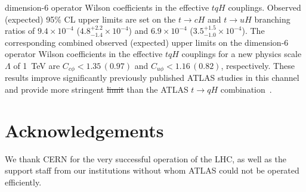 \documentclass[PAPER, coverpage, atlasdraft=true, texlive=2016, UKenglish]{\ATLASLATEXPATH atlasdoc}
\providecommand{\DIFadd}[1]{{\protect\color{blue}\uwave{#1}}} %
\providecommand{\DIFdel}[1]{{\protect\color{red}\sout{#1}}}                      %
\providecommand{\DIFaddbegin}{} %
\providecommand{\DIFaddend}{} %
\providecommand{\DIFdelbegin}{} %
\providecommand{\DIFdelend}{} %
\begin{document}
dimension-6 operator Wilson coefficients in the effective $tqH$ couplings. 
Observed (expected) 95\% CL upper limits are set on the $t\to cH$ and $t\to uH$ branching ratios of $9.4\times10^{-4}$ ($4.8^{+2.2}_{-1.4}\times10^{-4}$) and $6.9\times10^{-4}$ ($3.5^{+1.5}_{-1.0}\times10^{-4}$).
The corresponding combined observed (expected) upper limits on the dimension-6 operator Wilson coefficients in
the effective $tqH$ couplings for a new physics scale $\Lambda$ of 1~TeV are $C_{c\phi} <1.35\, (0.97)$ and $C_{u\phi} <1.16\, (0.82)$, respectively.
These results improve significantly \DIFaddbegin \DIFadd{upon the }\DIFaddend previously published ATLAS studies in this channel and provide more stringent \DIFdelbegin \DIFdel{limit }\DIFdelend \DIFaddbegin \DIFadd{limits }\DIFaddend than the ATLAS  $t\rightarrow qH$ combination~\cite{fcnc36}.


\section*{Acknowledgements}

We thank CERN for the very successful operation of the LHC, as well as the
support staff from our institutions without whom ATLAS could not be
operated efficiently.
\end{document}
